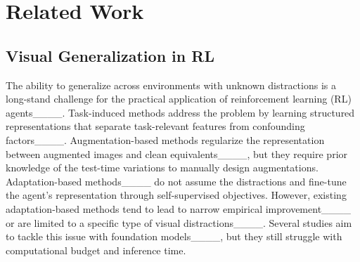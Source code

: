 \section{Related Work}
\subsection{Visual Generalization in RL}


The ability to generalize across environments with unknown distractions is a long-stand challenge for the practical application of reinforcement learning (RL) agents____. Task-induced methods address the problem by learning structured representations that separate task-relevant features from confounding factors____. Augmentation-based methods regularize the representation between augmented images and clean equivalents____, but they require prior knowledge of the test-time variations to manually design augmentations. Adaptation-based methods____ do not assume the distractions and fine-tune the agent’s representation through self-supervised objectives. However, existing adaptation-based methods tend to lead to narrow empirical improvement____ or are limited to a specific type of visual distractions____. Several studies aim to tackle this issue with foundation models____, but they still struggle with computational budget and inference time.


